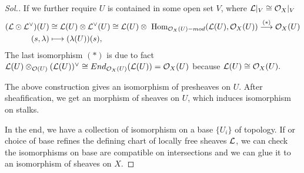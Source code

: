 \documentclass[11pt]{book} %
\begin{document}
\begin{proof}[Sol.]
 If we further require $U$ is contained in some open set $V$, where ${\cal L}|_V\cong {\cal O}_X|_V$
 $$
 \begin{aligned}
 ({\cal L}\odot {\cal L}^\vee)(U)&\cong {\cal L}(U)\otimes{\cal L}^{\vee}(U)\cong {\cal L}(U)\otimes\text{ Hom}_{{\cal O}_X(U)-mod}({\cal L}(U),{\cal O}_X(U))\overset{(*)}{\longrightarrow}{\cal O}_X(U)\\
  (s,\lambda)& \longmapsto (\lambda(U))(s),
 \end{aligned}
 $$
 The last isomorphism $(*)$ is due to fact ${\cal L}(U)\otimes_{{\cal O}(U)}({\cal L}(U))^\vee\cong End_{{\cal O}_X(U)}({\cal L}(U))={\cal O}_X(U)$ because ${\cal L}(U)\cong {\cal O}_X(U).$  

 The above construction gives an isomorphism of presheaves on $U$. After sheafification, we get an morphism of sheaves on $U$, which induces isomorphism on stalks.

 In the end, we have a collection of isomorphism on a base $\{U_i\}$ of topology. If or choice of base refines the defining chart of locally free sheaves ${\cal L}$, we can check the isomorphisms on base are compatible on intersections and we can glue it to an isomorphism of sheaves on $X$.
\end{proof}
\end{document}
